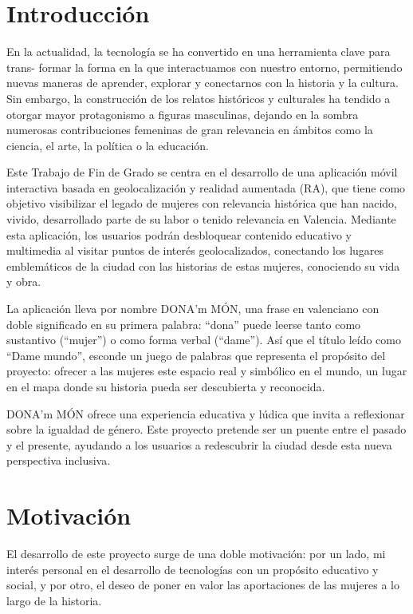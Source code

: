 
\section{Introducción}


En la actualidad, la tecnología se ha convertido en una herramienta clave para trans-
formar la forma en la que interactuamos con nuestro entorno, permitiendo nuevas maneras
de aprender, explorar y conectarnos con la historia y la cultura. Sin embargo, la construcción de los relatos históricos y culturales ha tendido a otorgar mayor protagonismo a figuras masculinas, dejando en la sombra numerosas contribuciones femeninas de gran relevancia en ámbitos como la ciencia, el arte, la política o la educación.

Este Trabajo de Fin de Grado se centra en el desarrollo de una aplicación móvil interactiva basada en geolocalización y realidad aumentada (RA), que tiene como objetivo visibilizar el legado de mujeres con relevancia histórica que han nacido, vivido, desarrollado parte de su labor o tenido relevancia en Valencia. Mediante esta aplicación, los usuarios podrán desbloquear contenido educativo y multimedia al visitar puntos de interés geolocalizados, conectando los lugares emblemáticos de la ciudad con las historias de estas mujeres, conociendo su vida y obra.

La aplicación lleva por nombre DONA’m MÓN, una frase en valenciano con doble significado en su primera palabra: “dona” puede leerse tanto como sustantivo (“mujer”) o como forma verbal (“dame”).  Así que el título leído como “Dame mundo”, esconde un juego de palabras que representa el propósito del proyecto: ofrecer a las mujeres este espacio real y simbólico en el mundo, un lugar en el mapa donde su historia pueda ser descubierta y reconocida.

DONA’m MÓN ofrece una experiencia educativa y lúdica que invita a reflexionar sobre la igualdad de género. Este proyecto pretende ser un puente entre el pasado y el presente, ayudando a los usuarios a redescubrir la ciudad desde esta nueva perspectiva inclusiva.



\section{Motivación}
El desarrollo de este proyecto surge de una doble motivación: por un lado, mi interés personal en el desarrollo de tecnologías con un propósito educativo y social, y por otro, el deseo de poner en valor las aportaciones de las mujeres a lo largo de la historia.

